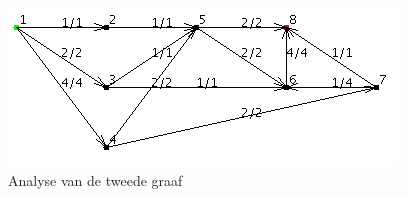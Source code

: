 \begin{figure}[h]
	\includegraphics[width=\linewidth]{priorityfirst/PFSgraph2}
	\centering
	\caption{Analyse van de tweede graaf}
	\label{fig:PFSgraph2}
\end{figure}